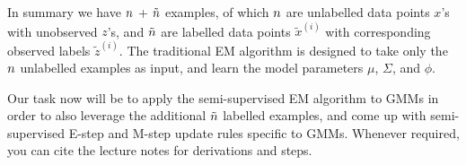 In summary we have ${n}$ + $\tilde{{n}}$ examples, of which ${n}$ are unlabelled data points $x$'s with unobserved $z$'s, and $\tilde{{n}}$ are labelled data points $\tilde{x}^{(i)}$ with corresponding observed labels $\tilde{z}^{(i)}$. The traditional EM algorithm is designed to take only the ${n}$ unlabelled examples as input, and learn the model parameters $\mu$, $\Sigma$, and $\phi$.


Our task now will be to apply the semi-supervised EM algorithm to GMMs in order to also leverage the additional $\tilde{{n}}$ labelled examples, and come up with semi-supervised E-step and M-step update rules specific to GMMs. Whenever required, you can cite the lecture notes for derivations and steps.


\begin{enumerate}
  \setcounter{enumii}{1}
  
  
  
  
  
\end{enumerate}
